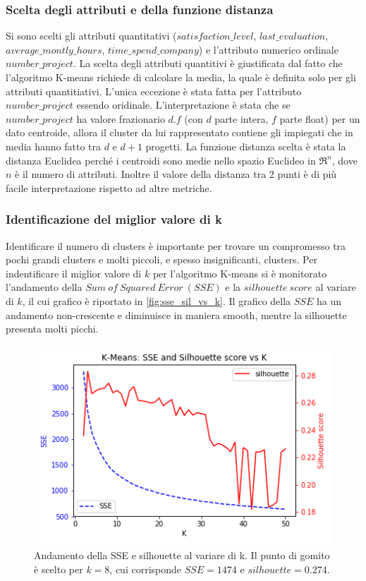 \documentclass[a4paper]{article}
\begin{document}
\subsubsection{Scelta degli attributi e della funzione distanza}
Si sono scelti gli attributi quantitativi ($satisfaction\_level$, $last\_evaluation$, $average\_montly\_hours$, $time\_spend\_company$) e l'attributo numerico ordinale $number\_project$. 
La scelta degli attributi quantitivi è giustificata dal fatto che l'algoritmo K-means richiede di calcolare la media, la quale è definita solo per gli attributi quantitiativi. 
L'unica eccezione è stata fatta per l'attributo $number\_project$ essendo oridinale.
L'interpretazione è stata che se $number\_project$ ha valore frazionario $d.f$ (con $d$ parte intera, $f$ parte float) per un dato centroide, allora il cluster da lui rappresentato contiene gli impiegati che in media hanno fatto tra $d$ e $d+1$ progetti.
La funzione distanza scelta è stata la distanza Euclidea perché i centroidi sono medie nello spazio Euclideo in $\Re^{n}$, dove $n$ è il numero di attributi. Inoltre il valore  della distanza tra 2 punti è di più facile interpretazione rispetto ad altre metriche. 

\subsubsection{Identificazione del miglior valore di k} \label{trovare_valore_di_k}
Identificare il numero di clusters è importante per trovare un compromesso tra pochi grandi clusters e molti piccoli, e spesso insignificanti, clusters. Per indentificare il miglior valore di $k$ per l'algoritmo K-means si è monitorato l'andamento della $Sum\ of\ Squared\ Error\ (SSE)$ e la $silhouette\ score$ al variare di $k$, il cui grafico è riportato in \autoref{fig:sse_sil_vs_k}. Il grafico della $SSE$ ha un andamento non-crescente e diminuisce in maniera smooth, mentre la silhouette presenta molti picchi.

\begin{figure}[hbtp]
\centering
\includegraphics[width=0.6\columnwidth]{sse_silhouette_vs_k.png}
\caption{Andamento della SSE e silhouette al variare di k. Il punto di gomito è scelto per $k=8$, cui corrisponde $SSE=1474$ e $silhouette=0.274$.}
\label{fig:sse_sil_vs_k}
\end{figure}%
\end{document}
